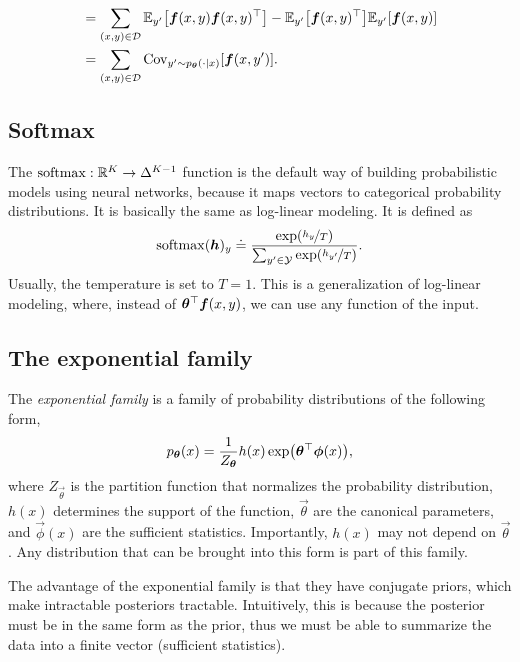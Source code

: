 \begin{align*}
                                                               & = \sum_{(x,y)\in\mathcal{D}} \E_{y'} \lft[ \vec{f}(x,y) \transpose{\vec{f}(x,y)} \rgt]  - \E_{y'} \lft[ \transpose{\vec{f}(x,y)} \rgt] \E_{y'} \lft[ \vec{f}(x,y) \rgt]                                                                                                                                     \\
                                                               & = \sum_{(x,y)\in\mathcal{D}} \mathrm{Cov}_{y' \sim p_{\vec{\theta}}(\cdot\mid x)} \lft[ \vec{f}(x,y') \rgt].
\end{align*}

\subsection{Softmax}


The $\mathrm{softmax}: \mathbb{R}^K \to \Delta^{K-1}$ function is the default way of building
probabilistic models using neural networks, because it maps vectors to
categorical probability distributions. It is basically the same as log-linear
modeling. It is defined as \[
    \softmax(\vec{h})_y \doteq \frac{\exp \lft( \nicefrac{h_y}{T} \rgt)}{\sum_{y'\in\mathcal{Y}} \exp \lft( \nicefrac{h_{y'}}{T} \rgt)}.
\]
Usually, the temperature is set to $T=1$. This is a generalization of
log-linear modeling, where, instead of $\bm{\theta}^\top
    \bm{f}(x,y)$, we can use any function of the input.

\subsection{The exponential family}

The \textit{exponential family} is a family of probability distributions of the
following form, \[
    p_{\vec{\theta}}(x) = \frac{1}{Z_{\vec{\theta}}} h(x) \exp \lft( \transpose{\vec{\theta}} \vec{\phi}(x) \rgt),
\]
where $Z_{\vec{\theta}}$ is the partition function that normalizes the
probability distribution, $h(x)$ determines the support of the function,
$\vec{\theta}$ are the canonical parameters, and $\vec{\phi}(x)$ are the
sufficient statistics. Importantly, $h(x)$ may not depend on $\vec{\theta}$.
Any distribution that can be brought into this form is part of this
family.

The advantage of the exponential family is that they have conjugate priors,
which make intractable posteriors tractable. Intuitively, this is because the
posterior must be in the same form as the prior, thus we must be able to
summarize the data into a finite vector (sufficient statistics).
